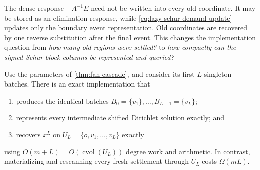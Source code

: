 The dense response $-A^{-1}E$ need not be written into every old coordinate.
It may be stored as an elimination response, while
\cref{eq:lazy-schur-demand-update} updates only the boundary event
representation.  Old coordinates are recovered by one reverse substitution
after the final event.  This changes the implementation question from
\emph{how many old regions were settled?} to \emph{how compactly can the
signed Schur block-columns be represented and queried?}

\begin{theorem}
\label{thm:fan-lazy-trace}
Use the parameters of \cref{thm:fan-cascade}, and consider its first $L$
singleton batches.  There is an exact implementation that
\begin{enumerate}[label=(\roman*),leftmargin=*]
 \item produces the identical batches
 $B_0=\{v_1\},\ldots,B_{L-1}=\{v_L\}$;
 \item represents every intermediate shifted Dirichlet solution exactly; and
 \item recovers $x^L$ on $U_L=\{o,v_1,\ldots,v_L\}$ exactly
\end{enumerate}
using $O(m+L)=O(\operatorname{cvol}(U_L))$ degree work and arithmetic.
In contrast, materializing and rescanning every fresh settlement through
$U_L$ costs $\Omega(mL)$.
\end{theorem}

